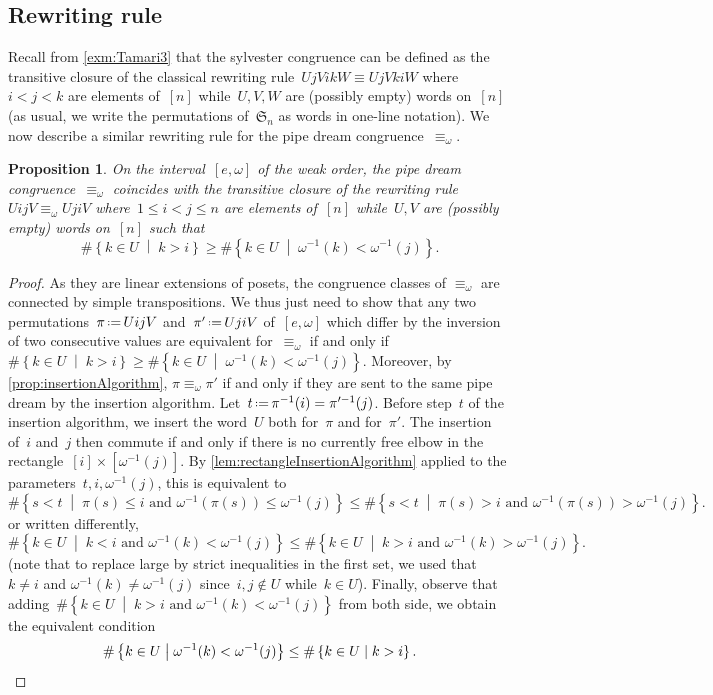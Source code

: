 \documentclass{amsart}
\newtheorem{proposition}[theorem]{Proposition}
\theoremstyle{definition}
\newcommand{\set}[2]{\left\{ #1 \;\middle|\; #2 \right\}} %
\newcommand{\eqdef}{\mbox{\,\raisebox{0.2ex}{\scriptsize\ensuremath{\mathrm:}}\ensuremath{=}\,}} %
\newcommand{\fS}{\mathfrak{S}} %
\begin{document}

\subsection{Rewriting rule}
\label{subsec:rewritingRule}

Recall from \cref{exm:Tamari3} that the sylvester congruence can be defined as the transitive closure of the classical rewriting rule~$UjVikW \equiv UjVkiW$ where~$i < j < k$ are elements of~$[n]$ while~$U, V, W$ are (possibly empty) words on~$[n]$ (as usual, we write the permutations of~$\fS_n$ as words in one-line notation).
We now describe a similar rewriting rule for the pipe dream congruence~$\equiv_\omega$.

\begin{proposition}
\label{prop:rewritingRule}
On the interval~$[e,\omega]$ of the weak order, the pipe dream congruence~$\equiv_\omega$ coincides with the transitive closure of the rewriting rule~$U ij V \equiv_\omega U ji V$ where~$1 \le i < j \le n$ are elements of~$[n]$ while~$U, V$ are (possibly empty) words on~$[n]$ such that
\[
\# \set{k \in U}{k > i} \ge \# \set{k \in U}{\omega^{-1}(k) < \omega^{-1}(j)}.
\]
\end{proposition}

\begin{proof}
As they are linear extensions of posets, the congruence classes of $\equiv_\omega$ are connected by simple transpositions.
We thus just need to show that any two permutations~$\pi \eqdef UijV$ and~$\pi' \eqdef UjiV$ of~$[e, \omega]$ which differ by the inversion of two consecutive values are equivalent for~$\equiv_\omega$ if and only if~$\# \set{k \in U}{k > i} \ge \# \set{k \in U}{\omega^{-1}(k) < \omega^{-1}(j)}$.
Moreover, by \cref{prop:insertionAlgorithm}, $\pi \equiv_\omega \pi'$ if and only if they are sent to the same pipe dream by the insertion algorithm.
Let~$t \eqdef \pi^{-1}(i) = \pi'^{-1}(j)$.
Before step~$t$ of the insertion algorithm, we insert the word~$U$ both for~$\pi$ and for~$\pi'$.
The insertion of~$i$ and~$j$ then commute if and only if there is no currently free elbow in the rectangle~$[i] \times [\omega^{-1}(j)]$.
By \cref{lem:rectangleInsertionAlgorithm} applied to the parameters~$t, i, \omega^{-1}(j)$, this is equivalent to
\[
\# \set{s < t}{\pi(s) \le i \text{ and } \omega^{-1}(\pi(s)) \le \omega^{-1}(j)} \le \# \set{s < t}{\pi(s) > i \text{ and } \omega^{-1}(\pi(s)) > \omega^{-1}(j)}.
\]
or written differently,
\[
\# \set{k \in U}{k < i \text{ and } \omega^{-1}(k) < \omega^{-1}(j)} \le \# \set{k \in U}{k > i \text{ and } \omega^{-1}(k) > \omega^{-1}(j)}.
\]
(note that  to replace large by strict inequalities in the first set, we used that~$k \ne i$ and ${\omega^{-1}(k) \ne \omega^{-1}(j)}$ since~$i,j \notin U$ while~$k \in U$).
Finally, observe that adding~$\# \set{k \in U}{k > i \text{ and } \omega^{-1}(k) < \omega^{-1}(j)}$ from both side, we obtain the equivalent condition
\[
\# \set{k \in U}{\omega^{-1}(k) < \omega^{-1}(j)} \le \# \set{k \in U}{k > i}.
\qedhere
\]
\end{proof}
\end{document}
